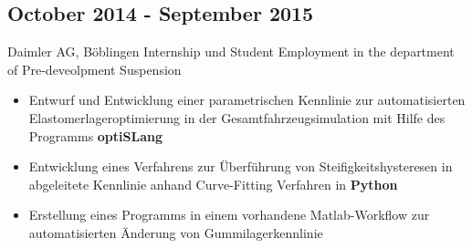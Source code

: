 \documentclass{mycv}
\begin{document}
\begin{paracol}{2}
\subsection{October 2014 - September 2015}{Daimler AG, B{\"o}blingen}
{Internship und Student Employment in the department of Pre-deveolpment
	Suspension}
	  \begin{itemize}
			\item Entwurf und Entwicklung einer parametrischen Kennlinie zur
				automatisierten Elastomerlageroptimierung in der
				Gesamtfahrzeugsimulation mit Hilfe des Programms {\bfseries
				optiSLang}
			\item Entwicklung eines Verfahrens zur {\"U}berf{\"u}hrung von
				Steifigkeitshysteresen in abgeleitete Kennlinie anhand Curve-Fitting
				Verfahren in {\bfseries Python}
			\item Erstellung eines Programms in einem vorhandene Matlab-Workflow zur
				automatisierten {\"A}nderung von Gummilagerkennlinie\\
		\end{itemize}
\end{paracol}
\end{document}
